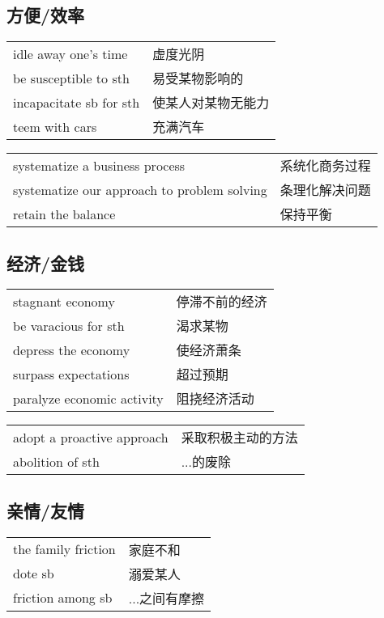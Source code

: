 \subsection{方便/效率}

\begin{tabular}{ll}
    idle away one's time    & 虚度光阴      \\
    be susceptible to sth   & 易受某物影响的   \\
    incapacitate sb for sth & 使某人对某物无能力 \\
    teem with cars          & 充满汽车      \\
\end{tabular}

\begin{tabular}{ll}
    systematize a business process              & 系统化商务过程 \\
    systematize our approach to problem solving & 条理化解决问题 \\
    retain the balance                          & 保持平衡    \\
\end{tabular}

\subsection{经济/金钱}

\begin{tabular}{ll}
    stagnant economy           & 停滞不前的经济 \\
    be varacious for sth       & 渴求某物    \\
    depress the economy        & 使经济萧条   \\
    surpass expectations       & 超过预期    \\
    paralyze economic activity & 阻挠经济活动  \\
\end{tabular}

\begin{tabular}{ll}
    adopt a proactive approach & 采取积极主动的方法 \\
    abolition of sth           & ...的废除    \\
\end{tabular}

\subsection{亲情/友情}

\begin{tabular}{ll}
    the family friction & 家庭不和     \\
    dote sb             & 溺爱某人     \\
    friction among sb   & ...之间有摩擦 \\
\end{tabular}

